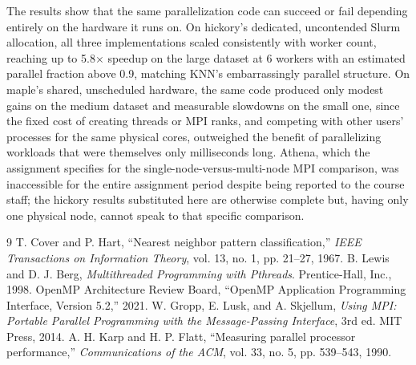 \documentclass[conference]{IEEEtran}
\begin{document}
The results show that the same parallelization code can succeed or fail
depending entirely on the hardware it runs on. On hickory's dedicated,
uncontended Slurm allocation, all three implementations scaled
consistently with worker count, reaching up to 5.8$\times$ speedup on the
large dataset at 6 workers with an estimated parallel fraction above 0.9,
matching KNN's embarrassingly parallel structure. On maple's shared,
unscheduled hardware, the same code produced only modest gains on the
medium dataset and measurable slowdowns on the small one, since the fixed
cost of creating threads or MPI ranks, and competing with other users'
processes for the same physical cores, outweighed the benefit of
parallelizing workloads that were themselves only milliseconds long.
Athena, which the assignment specifies for the single-node-versus-multi-node
MPI comparison, was inaccessible for the entire assignment period despite
being reported to the course staff; the hickory results substituted here
are otherwise complete but, having only one physical node, cannot speak to
that specific comparison.

\begin{thebibliography}{9}
 T. Cover and P. Hart, ``Nearest neighbor pattern classification,'' \emph{IEEE Transactions on Information Theory}, vol. 13, no. 1, pp. 21--27, 1967.
 B. Lewis and D. J. Berg, \emph{Multithreaded Programming with Pthreads}. Prentice-Hall, Inc., 1998.
 OpenMP Architecture Review Board, ``OpenMP Application Programming Interface, Version 5.2,'' 2021.
 W. Gropp, E. Lusk, and A. Skjellum, \emph{Using MPI: Portable Parallel Programming with the Message-Passing Interface}, 3rd ed. MIT Press, 2014.
 A. H. Karp and H. P. Flatt, ``Measuring parallel processor performance,'' \emph{Communications of the ACM}, vol. 33, no. 5, pp. 539--543, 1990.
\end{thebibliography}
\end{document}
